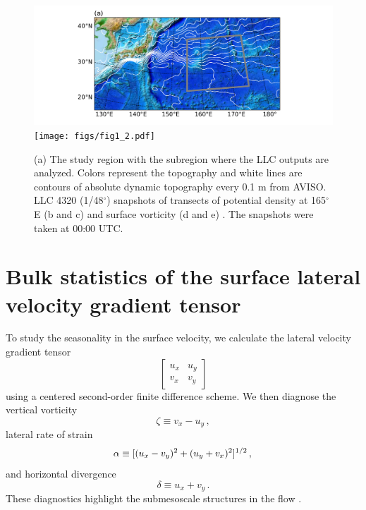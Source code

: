 \documentclass[grl]{agutex2015}
\begin{document}
\begin{article}
\begin{figure}[ht]
\begin{center}
\hspace{-1.25cm}\includegraphics[width=.7\textwidth]{figs/fig1_1.pdf}\\
\vspace{-.125cm}
\texttt{[image: figs/fig1\_2.pdf]}
 \caption{\small (a) The study region with the subregion where the LLC outputs are
          analyzed. Colors represent the topography and white lines are contours of absolute
          dynamic topography every 0.1 m from AVISO. LLC 4320 (1/48$^\circ$) snapshots of
          transects
          of potential density at 165$^\circ$E (b and c) and  surface vorticity (d and e) . The snapshots were
          taken at 00:00 UTC.}
\vspace{-1.5cm}
 \label{fig1}
 \end{center}
 \end{figure}

\section{Bulk statistics of the surface lateral velocity gradient tensor}
To study the seasonality in the surface velocity, we calculate the lateral velocity gradient tensor
\begin{equation}
\left[\begin{matrix} u_x & u_y\\ v_x&v_y \end{matrix}\right]
\end{equation}
using a centered
second-order finite difference scheme. We then diagnose
the vertical vorticity
\begin{equation}
\zeta \equiv v_x - u_y\, ,
\end{equation}
lateral rate of strain
\begin{equation}
  \alpha \equiv [(u_x-v_y)^2 + (u_y + v_x)^2]^{1/2}\,,\\
\end{equation}
and horizontal divergence
\begin{equation}
\delta \equiv u_x + v_y\, .
\end{equation}
These diagnostics highlight the submesoscale structures in the flow
\citep[e.g.,][]{shcherbina_etal2013}.


\end{article}
\end{document}
